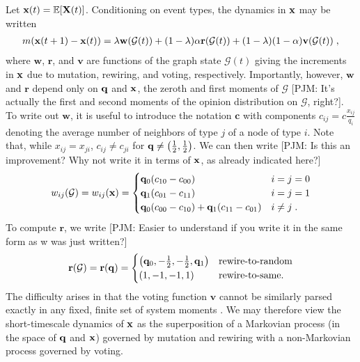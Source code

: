 \documentclass[review, onefignum, onetabnum]{siamart171218}
\newcommand{\pjm}[1]{{\color{blue}[PJM: #1]}}
\begin{document}
	Let $\mathbf{x}(t) = \mathbb{E}[\mathbf{X}(t)]$. 
	Conditioning on event types, the dynamics in $\mathbf{x}$ may be written
	\begin{align}
		m(\x(t+1) - \x(t)) = \lambda \mathbf{w}(\mathcal{G}(t)) + (1-\lambda)\alpha \mathbf{r}(\mathcal{G}(t)) + (1-\lambda)(1-\alpha) \mathbf{v}(\mathcal{G}(t))\;, \label{eq:dynamics}
	\end{align}
	where $\mathbf{w}$, $\mathbf{r}$, and $\mathbf{v}$ are functions of the graph state $\mathcal{G}(t)$ giving the increments in $\mathbf{x}$ due to mutation, rewiring, and voting, respectively. 
	Importantly, however, $\mathbf{w}$ and $\mathbf{r}$ depend only on $\mathbf{q}$ and $\mathbf{x}$, the zeroth and first moments of $\mathcal{G}$ \pjm{It's actually the first and second moments of the opinion distribution on $\mathcal{G}$, right?}. 
	To write out $\mathbf{w}$, it is useful to introduce the notation $\mathbf{c}$ with components $c_{ij} = c\frac{x_{ij}}{q_i}$ denoting the average number of neighbors of type $j$ of a node of type $i$. 
	Note that, while $x_{ij} = x_{ji}$, $c_{ij} \neq c_{ji}$ for $\mathbf{q} \neq \left(\frac{1}{2}, \frac{1}{2}\right)$. 
	We can then write \pjm{Is this an improvement? Why not write it in terms of $\mathbf{x}$, as already indicated here?}
	\begin{align*}
		w_{ij}(\mathcal{G}) = w_{ij}(\mathbf{x}) = 
		\begin{cases}
			\mathbf{q}_{0}(c_{10} - c_{00}) &  i = j = 0 \\ 
			\mathbf{q}_1 (c_{01}-c_{11}) & i = j = 1 \\ 
			\mathbf{q}_0 (c_{00}  - c_{10}) +  \mathbf{q}_1(c_{11}-c_{01}) & i \neq j\;.
		\end{cases}
	\end{align*}
	To compute $\mathbf{r}$, we write \pjm{Easier to understand if you write it in the same form as w was just written?}
	\begin{align*}
		\mathbf{r}(\mathcal{G}) = \mathbf{r}(\mathbf{q}) = 
		\begin{cases}
			\left(\mathbf{q}_0, -\frac{1}{2}, -\frac{1}{2}, \mathbf{q}_1\right) & \text{rewire-to-random}\\
			\left(1, -1, -1, 1\right) & \text{rewire-to-same}.
		\end{cases}
	\end{align*}
	The difficulty arises in that the voting function $\mathbf{v}$ cannot be similarly parsed exactly in any fixed, finite set of system moments \cite{Demirel2012}. 
	We may therefore view the short-timescale dynamics of $\mathbf{x}$ as the superposition of a Markovian process (in the space of $\mathbf{q}$ and $\mathbf{x}$) governed by mutation and rewiring with a non-Markovian process governed by voting. 
	
\end{document}
